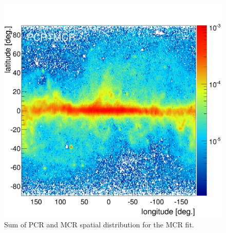 \newpage
\begin{figure}[h]
  \centering
  \includegraphics[width=\linewidth]{pic/discussion/MCRonly_fine_PCR+MCR_integral_distribution.png}	 
  \caption[Skymap of the PCR and MCR sum.]{Sum of PCR and MCR spatial distribution for the MCR fit.}
  \label{app:PCR+MCR_integral_distribution}	 
\end{figure}


